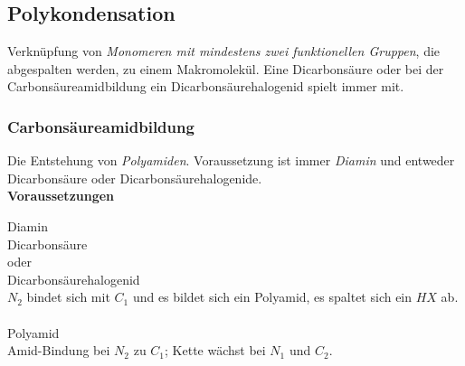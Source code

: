 \subsection{Polykondensation}

Verknüpfung von \textit{Monomeren mit mindestens zwei funktionellen Gruppen}, die abgespalten werden, zu einem Makromolekül. Eine Dicarbonsäure oder bei der Carbonsäureamidbildung ein Dicarbonsäurehalogenid spielt immer mit.

\subsubsection{Carbonsäureamidbildung}

Die Entstehung von \textit{Polyamiden}. Voraussetzung ist immer \textit{Diamin} und entweder Dicarbonsäure oder Dicarbonsäurehalogenide. \\

\textbf{Voraussetzungen}

 Diamin\\

 Dicarbonsäure\\

oder\\

\hspace{.3em} Dicarbonsäurehalogenid\\



$N_2$ bindet sich mit $C_1$ und es bildet sich ein Polyamid, es spaltet sich ein $HX$ ab.\\

\\

Polyamid\\

Amid-Bindung bei $N_2$ zu $C_1$; Kette wächst bei $N_1$ und $C_2$.

